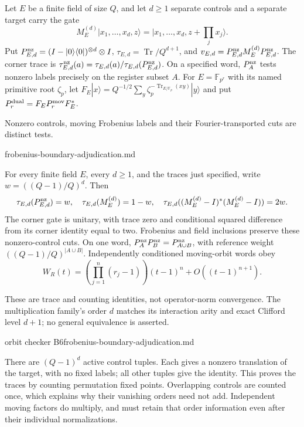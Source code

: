 \begin{definition}
Let $E$ be a finite field of size $Q$, and let $d\geq1$ separate controls
and a separate target carry the gate
\[
 M_E^{(d)}|x_1,\ldots,x_d,z\rangle
 =|x_1,\ldots,x_d,z+\textstyle\prod_j x_j\rangle.
\]
Put $P_{E,d}^{\rm nz}=(I-|0\rangle\langle0|)^{\otimes d}\otimes I$,
$\tau_{E,d}=\operatorname{Tr}/Q^{d+1}$, and
$v_{E,d}=P_{E,d}^{\rm nz}M_E^{(d)}P_{E,d}^{\rm nz}$.
The corner trace is
$\tau_{E,d}^{\rm nz}(a)=\tau_{E,d}(a)/\tau_{E,d}(P_{E,d}^{\rm nz})$.
On a specified word, $P_A^{\rm nz}$ tests nonzero labels precisely on
the register subset $A$.
For $E=\mathbb F_{p^r}$ with its named primitive root $\zeta_p$, let
$F_E|x\rangle=Q^{-1/2}\sum_y\zeta_p^{-\operatorname{Tr}_{E/\mathbb F_p}(xy)}|y\rangle$
and put $P_r^{\rm dual}=F_EP_r^{\rm mov}F_E^*$.
\end{definition}
\begin{scope}
Nonzero controls, moving Frobenius labels and their Fourier-transported
cuts are distinct tests.
\end{scope}
{frobenius-boundary-adjudication.md}

\begin{proposition}
\statusProved\quad
For every finite field $E$, every $d\geq1$, and the traces just specified,
write $w=((Q-1)/Q)^d$. Then
\[
 \tau_{E,d}(P_{E,d}^{\rm nz})=w,\quad
 \tau_{E,d}(M_E^{(d)})=1-w,\quad
 \tau_{E,d}((M_E^{(d)}-I)^*(M_E^{(d)}-I))=2w.
\]
The corner gate is unitary, with trace zero and conditional squared
difference from its corner identity equal to two. Frobenius and field
inclusions preserve these nonzero-control cuts. On one word,
$P_A^{\rm nz}P_B^{\rm nz}=P_{A\cup B}^{\rm nz}$, with reference weight
$((Q-1)/Q)^{|A\cup B|}$. Independently conditioned moving-orbit words obey
\[
 W_R(t)=\left(\prod_{j=1}^n(r_j-1)\right)(t-1)^n
         +O((t-1)^{n+1}).
\]
\end{proposition}
\begin{scope}
These are trace and counting identities, not operator-norm convergence.
The multiplication family's order $d$ matches its interaction arity and
exact Clifford level $d+1$; no general equivalence is asserted.
\end{scope}
{orbit checker B6}{frobenius-boundary-adjudication.md}

There are $(Q-1)^d$ active control tuples. Each gives a nonzero translation
of the target, with no fixed labels; all other tuples give the identity.
This proves the traces by counting permutation fixed points. Overlapping
controls are counted once, which explains why their vanishing orders need
not add. Independent moving factors do multiply, and must retain that
order information even after their individual normalizations.

